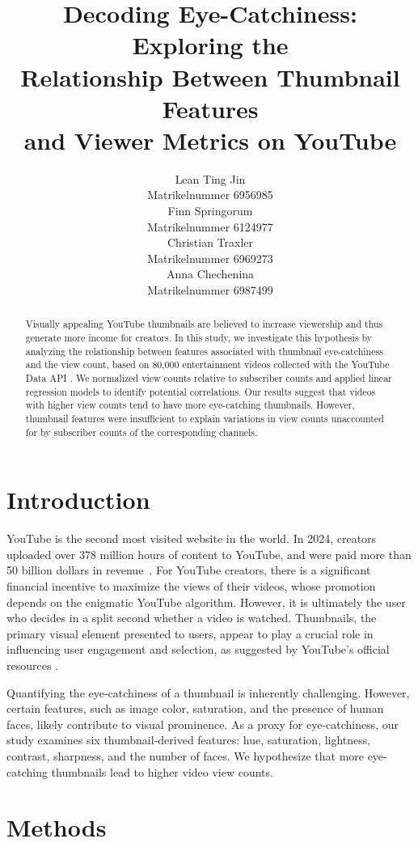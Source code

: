\documentclass{article}
\title{Decoding Eye-Catchiness: Exploring the\\Relationship Between Thumbnail Features\\and Viewer Metrics on YouTube}
\author{%
  Lean Ting Jin\\
  Matrikelnummer 6956985\\
  \And
  Finn Springorum\\
  Matrikelnummer 6124977\\
  \AND
  Christian Traxler\\
  Matrikelnummer 6969273\\
  \And
  Anna Chechenina\\
  Matrikelnummer 6987499\\
}
\begin{document}
\maketitle

\begin{abstract}
Visually appealing YouTube thumbnails are believed to increase viewership and thus generate more income for creators. In this study, we investigate this hypothesis by analyzing the relationship between features associated with thumbnail eye-catchiness and the view count, based on 80,000 entertainment videos collected with the YouTube Data API \cite{youtubeapi}. We normalized view counts relative to subscriber counts and applied linear regression models to identify potential correlations. Our results suggest that videos with higher view counts tend to have more eye-catching thumbnails. However, thumbnail features were insufficient to explain variations in view counts unaccounted for by subscriber counts of the corresponding channels.
\end{abstract}

\section{Introduction}
YouTube is the second most visited website in the world. In 2024, creators uploaded over 378 million hours of content to YouTube, and were paid more than 50 billion dollars in revenue~\cite{youtube-stats}. For YouTube creators, there is a significant financial incentive to maximize the views of their videos, whose promotion depends on the enigmatic YouTube algorithm. However, it is ultimately the user who decides in a split second whether a video is watched. Thumbnails, the primary visual element presented to users, appear to play a crucial role in influencing user engagement and selection, as suggested by YouTube's official resources \cite{YouTubeThumbnail}.

Quantifying the eye-catchiness of a thumbnail is inherently challenging. However, certain features, such as image color, saturation, and the presence of human faces, likely contribute to visual prominence. As a proxy for eye-catchiness, our study examines six thumbnail-derived features: hue, saturation, lightness, contrast, sharpness, and the number of faces. We hypothesize that more eye-catching thumbnails lead to higher video view counts.

\section{Methods}
\end{document}
